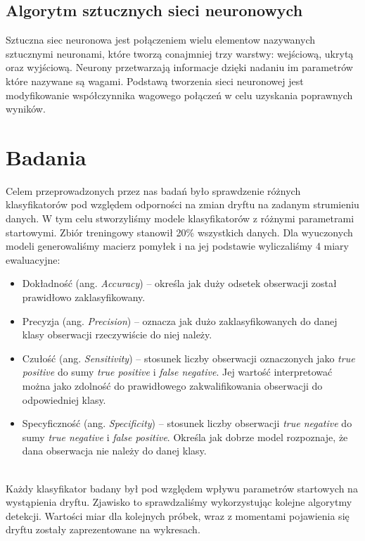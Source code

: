 \documentclass{classrep}
\begin{document}
\subsection{Algorytm sztucznych sieci neuronowych}
Sztuczna siec neuronowa  jest połączeniem wielu elementow nazywanych sztucznymi neuronami, które tworzą conajmniej trzy warstwy: wejściową, ukrytą oraz wyjściową. Neurony przetwarzają informacje dzięki nadaniu im parametrów które nazywane są wagami. Podstawą tworzenia sieci neuronowej jest modyfikowanie współczynnika wagowego połączeń w celu uzyskania poprawnych wyników.

\section{Badania}

Celem przeprowadzonych przez nas badań było sprawdzenie różnych klasyfikatorów pod względem odporności na zmian dryftu na zadanym strumieniu danych. W tym celu stworzyliśmy modele klasyfikatorów z różnymi parametrami startowymi. Zbiór treningowy stanowił 20\% wszystkich danych. Dla wyuczonych modeli generowaliśmy macierz pomyłek i na jej podstawie wyliczaliśmy 4 miary ewaluacyjne:
\begin{itemize}
    \item Dokładność (ang. \textit{Accuracy}) -- określa jak duży odsetek obserwacji został prawidłowo zaklasyfikowany.
    \item Precyzja (ang. \textit{Precision}) -- oznacza jak dużo zaklasyfikowanych do danej klasy obserwacji rzeczywiście do niej należy. 
    \item Czułość (ang. \textit{Sensitivity}) -- stosunek liczby obserwacji oznaczonych jako \textit{true positive} do sumy \textit{true positive} i \textit{false negative}. Jej wartość interpretować można jako zdolność do prawidłowego zakwalifikowania obserwacji do odpowiedniej klasy. 
    \item Specyficzność (ang. \textit{Specificity}) -- stosunek liczby obserwacji \textit{true negative} do sumy \textit{true negative} i \textit{false positive}. Określa jak dobrze model rozpoznaje, że dana obserwacja nie należy do danej klasy.
\end{itemize} 

~\\ Każdy klasyfikator badany był pod względem wpływu parametrów startowych na wystąpienia dryftu. Zjawisko to sprawdzaliśmy wykorzystując kolejne algorytmy detekcji. Wartości miar dla kolejnych próbek, wraz z momentami pojawienia się dryftu zostały zaprezentowane na wykresach.
\end{document}
